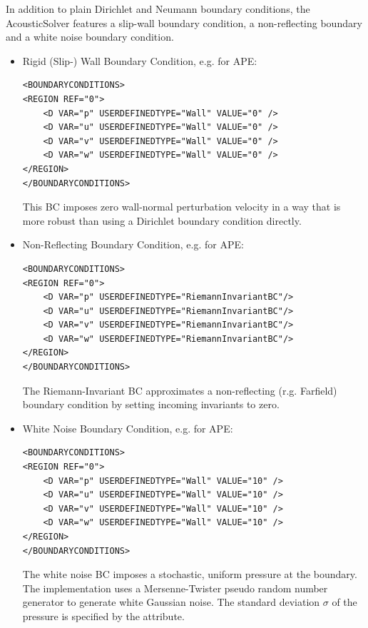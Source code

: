 In addition to plain Dirichlet and Neumann boundary conditions, the AcousticSolver features a slip-wall boundary condition, a non-reflecting boundary and a white noise boundary condition.
\begin{itemize}
\item Rigid (Slip-) Wall Boundary Condition, e.g. for APE:
\begin{lstlisting}[style=XmlStyle]
<BOUNDARYCONDITIONS>
<REGION REF="0">
    <D VAR="p" USERDEFINEDTYPE="Wall" VALUE="0" />
    <D VAR="u" USERDEFINEDTYPE="Wall" VALUE="0" />
    <D VAR="v" USERDEFINEDTYPE="Wall" VALUE="0" />
    <D VAR="w" USERDEFINEDTYPE="Wall" VALUE="0" />
</REGION>
</BOUNDARYCONDITIONS>
\end{lstlisting}
This BC imposes zero wall-normal perturbation velocity in a way that is more robust than using a Dirichlet boundary condition directly.

\item Non-Reflecting Boundary Condition, e.g. for APE:
\begin{lstlisting}[style=XmlStyle]
<BOUNDARYCONDITIONS>
<REGION REF="0">
    <D VAR="p" USERDEFINEDTYPE="RiemannInvariantBC"/>
    <D VAR="u" USERDEFINEDTYPE="RiemannInvariantBC"/>
    <D VAR="v" USERDEFINEDTYPE="RiemannInvariantBC"/>
    <D VAR="w" USERDEFINEDTYPE="RiemannInvariantBC"/>
</REGION>
</BOUNDARYCONDITIONS>
\end{lstlisting}
The Riemann-Invariant BC approximates a non-reflecting (r.g. Farfield)  boundary condition by setting incoming invariants to zero.

\item White Noise Boundary Condition, e.g. for APE:
\begin{lstlisting}[style=XmlStyle]
<BOUNDARYCONDITIONS>
<REGION REF="0">
    <D VAR="p" USERDEFINEDTYPE="Wall" VALUE="10" />
    <D VAR="u" USERDEFINEDTYPE="Wall" VALUE="10" />
    <D VAR="v" USERDEFINEDTYPE="Wall" VALUE="10" />
    <D VAR="w" USERDEFINEDTYPE="Wall" VALUE="10" />
</REGION>
</BOUNDARYCONDITIONS>
\end{lstlisting}
The white noise BC imposes a stochastic, uniform pressure at the boundary. The implementation uses a Mersenne-Twister pseudo random number generator to generate white Gaussian noise.
The standard deviation $\sigma$ of the pressure  is specified by the  attribute.


\end{itemize}
